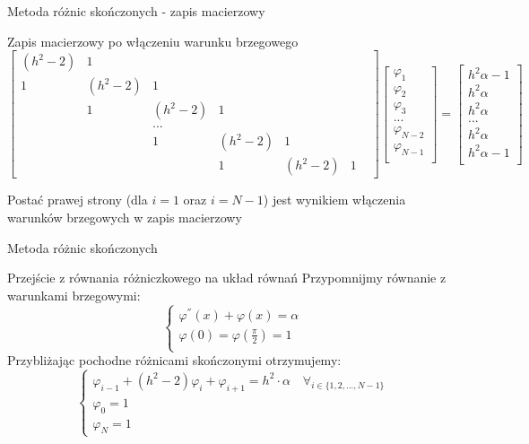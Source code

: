 \begin{frame}{Metoda różnic skończonych - zapis macierzowy}
	\begin{exampleblock}{Zapis macierzowy po włączeniu warunku brzegowego}
	{\scriptsize
	$$
	\begin{bmatrix}
	(h^2 -2) & 1 &  &  &  &  & \\ 
	1&  (h^2 -2)& 1 &  &  &  & \\ 
	& 1 &  (h^2 -2)& 1 &  &  & \\ 
	&  &  ...& &  &  & \\ 
	&  & 1 & (h^2 -2) &  1& & \\ 
	&  &  & 1 &  (h^2 -2)& 1 &
	\end{bmatrix}		
	\begin{bmatrix}
	\varphi_1 \\
	\varphi_2 \\
	\varphi_3 \\
	...\\
	\varphi_{N-2}\\
	\varphi_{N-1}\\
	\end{bmatrix}		
	= 		
	\begin{bmatrix} 
	h^2\alpha -1 \\
	h^2\alpha\\
	h^2\alpha\\
	... \\
	h^2\alpha\\
	h^2\alpha - 1\\
	\end{bmatrix}
	$$}
	
	Postać prawej strony (dla $i = 1$ oraz $i = N-1$) jest wynikiem włączenia warunków brzegowych w zapis macierzowy
	\end{exampleblock}
\end{frame}
\begin{frame}{Metoda różnic skończonych}
	\begin{exampleblock}{Przejście z równania różniczkowego na układ równań}
		Przypomnijmy równanie z warunkami brzegowymi:
		$$
		\begin{cases}
		\varphi^{''}(x) + \varphi(x) = \alpha \\
		\varphi(0) = \varphi(\frac{\pi}{2}) = 1 \\
		\end{cases}
		$$
		Przybliżając pochodne różnicami skończonymi otrzymujemy:
		$$
		\begin{cases}
		\varphi_{i-1} + (h^2 - 2)\varphi_i + \varphi_{i+1} = h^2 \cdot \alpha \quad \forall_{i \in \{1,2, ..., N-1\}} \\
		\varphi_0 = 1 \\
		\varphi_N = 1
		\end{cases}
		$$
	\end{exampleblock}	
\end{frame}

